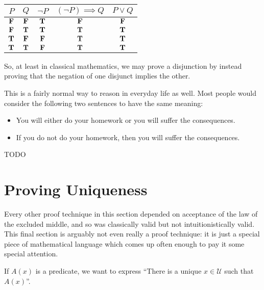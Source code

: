 \begin{solutions}
	
			\begin{table}[h!]
		\begin{center}
			\begin{tabular}{c|c|c|c|c} 
				$P$ & $Q$ & $\neg P$ & $(\neg P) \implies Q$  & $P \vee Q$ \\
				\hline
				$\textbf{\textrm{F}}$ & $\textbf{\textrm{F}}$ & $\textbf{\textrm{T}}$ & $\textbf{\textrm{F}}$  & $\textbf{\textrm{F}}$ \\
				$\textbf{\textrm{F}}$ & $\textbf{\textrm{T}}$ & $\textbf{\textrm{T}}$ & $\textbf{\textrm{T}}$  & $\textbf{\textrm{T}}$ \\
				$\textbf{\textrm{T}}$ & $\textbf{\textrm{F}}$ & $\textbf{\textrm{F}}$ & $\textbf{\textrm{T}}$  & $\textbf{\textrm{T}}$ \\
				$\textbf{\textrm{T}}$ & $\textbf{\textrm{T}}$ & $\textbf{\textrm{F}}$ & $\textbf{\textrm{T}}$  & $\textbf{\textrm{T}}$ \\
		\hline
			\end{tabular}
		\end{center}
	\end{table}
	\end{solutions}

So, at least in classical mathematics, we may prove a disjunction by instead proving that the negation of one disjunct implies the other.

This is a fairly normal way to reason in everyday life as well.  Most people would consider the following two sentences to have the same meaning:

\begin{itemize}
		\item You will either do your homework or you will suffer the consequences.
		\item If you do not do your homework, then you will suffer the consequences.
	\end{itemize}

\begin{xca}
		TODO
	\end{xca}

\section{Proving Uniqueness}

Every other proof technique in this section depended on acceptance of the law of the excluded middle, and so was classically valid but not intuitionistically valid.  This final section is arguably not even really a proof technique:  it is just a special piece of mathematical language which comes up often enough to pay it some special attention.

 If $A(x)$ is a predicate, we want to express ``There is a unique $x \in \mathcal{U}$ such that $A(x)$''.

